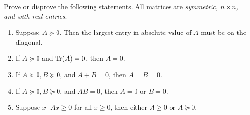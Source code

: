 \newpage
\pb
Prove or disprove the following statements. All matrices are \textit{symmetric, $n \times n$, and with real entries}.
\begin{enumerate}[leftmargin=*, label=(\alph*)]
\item Suppose $A \succeq 0$. Then the largest entry in absolute value of $A$ must be on the diagonal.
\item If $A \succeq 0$ and $\operatorname{Tr}(A) = 0$, then $A = 0$.
\item If $A \succeq 0, B \succeq 0$, and $A + B = 0$, then $A = B = 0$.
\item If $A \succeq 0, B \succeq 0$, and $AB = 0$, then $A = 0$ or $B = 0$.
\item Suppose $x^\top Ax\ge0$ for all $x\ge0$, then either $A\ge0$ or $A\succeq0$. \end{enumerate}
\soln 

